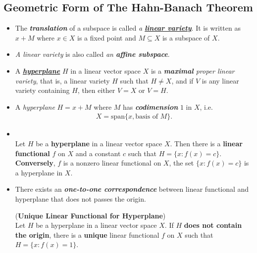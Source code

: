 \documentclass[11pt]{article}
\begin{document}
\subsection{Geometric Form of The Hahn-Banach Theorem}
\begin{itemize}
\item \begin{definition}
The \emph{\textbf{translation}} of a subspace is called \emph{a \underline{\textbf{linear variety}}}. It is written as $x + M$ where $x\in X$ is a fixed point and $M\subseteq X$ is a subspace of $X$.
\end{definition}

\item \begin{remark}
\emph{A linear variety} is also called \emph{an \textbf{affine subspace}}.
\end{remark}

\item \begin{definition}
A \underline{\emph{\textbf{hyperplane}}} $H$ in a linear vector space $X$ is a \emph{\textbf{maximal} proper linear variety}, that is, a linear variety $H$ such that $H \neq X$, and if $V$ is any linear variety containing $H$, then either $V = X$ or $V = H$.
\end{definition}

\item \begin{remark}
A \emph{hyperplane} $H = x + M$ where $M$ has \emph{\textbf{codimension}} $1$ in $X$, i.e. 
\begin{align*}
X = \text{span}\{x, \text{basis of }M\}.
\end{align*}
\end{remark}

\item \begin{proposition} \citep{luenberger1997optimization}\\
Let $H$ be a \textbf{hyperplane} in a linear vector space $X$. Then there is a \textbf{linear functional} $f$ on $X$ and a constant $c$ such that $H =\{x: f(x) =c\}$.
\textbf{Conversely}, $f$ is a nonzero linear functional on $X$, the set $\{x: f(x) =c\}$ is a hyperplane in $X$.
\end{proposition}

\item There exists an \emph{\textbf{one-to-one correspondence}} between linear functional and hyperplane that does not passes the origin.
\begin{proposition} (\textbf{Unique Linear Functional for Hyperplane}) \citep{luenberger1997optimization}\\
Let $H$ be a hyperplane in a linear vector space $X$. If $H$ \textbf{does not contain the origin}, there is a \textbf{unique} linear functional $f$ on $X$ such that
$H =\{x: f(x) =1 \}$.
\end{proposition}


\end{itemize}
\end{document}
